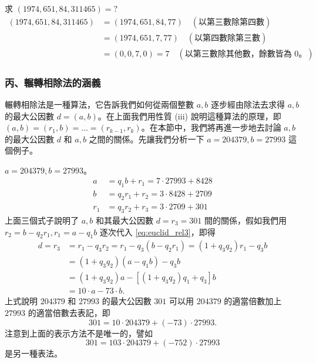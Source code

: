 \begin{example}\label{ex:6-2-5}
求 $(1974, 651, 84, 311465) = ?$
\begin{align*}
  (1974, 651, 84, 311465) &= (1974, 651, 84, 77) \quad (\text{以第三數除第四數}) \\
  &= (1974, 651, 7, 77) \quad (\text{以第四數除第三數}) \\
  &= (0, 0, 7, 0) = 7 \quad (\text{以第三數除其他數，餘數皆為 } 0\text{。})
\end{align*}
\end{example}

\subsubsection*{丙、輾轉相除法的涵義}\label{subsec:6-2-c}

輾轉相除法是一種算法，它告訴我們如何從兩個整數 $a, b$ 逐步經由除法去求得 $a, b$ 的最大公因數 $d=(a, b)$。在上面我們用性質 (iii) 說明這種算法的原理，即 $(a, b) = (r_1, b) = \dots = (r_{k-1}, r_k)$。在本節中，我們將再進一步地去討論 $a, b$ 的最大公因數 $d$ 和 $a, b$ 之間的關係。先讓我們分析一下 $a=204379, b=27993$ 這個例子。

\begin{example}\label{ex:6-2-6}
$a=204379, b=27993$。
\begin{align}
  a &= q_1 b + r_1 = 7 \cdot 27993 + 8428 \label{eq:euclid_rel1} \\
  b &= q_2 r_1 + r_2 = 3 \cdot 8428 + 2709 \label{eq:euclid_rel2} \\
  r_1 &= q_3 r_2 + r_3 = 3 \cdot 2709 + 301 \label{eq:euclid_rel3}
\end{align}
上面三個式子說明了 $a, b$ 和其最大公因數 $d=r_3=301$ 間的關係，假如我們用 $r_2 = b - q_2 r_1, r_1 = a - q_1 b$ 逐次代入 \eqref{eq:euclid_rel3}，即得
\begin{align*}
  d = r_3 &= r_1 - q_3 r_2 = r_1 - q_3(b - q_2 r_1) = (1 + q_3 q_2) r_1 - q_3 b \\
  &= (1 + q_3 q_2)(a - q_1 b) - q_3 b \\
  &= (1 + q_3 q_2) a - [(1 + q_3 q_2) q_1 + q_3] b \\
  &= 10 \cdot a - 73 \cdot b.
\end{align*}
上式說明 $204379$ 和 $27993$ 的最大公因數 $301$ 可以用 $204379$ 的適當倍數加上 $27993$ 的適當倍數去表記，即
\begin{equation*}
  301 = 10 \cdot 204379 + (-73) \cdot 27993.
\end{equation*}
注意到上面的表示方法不是唯一的，譬如
\begin{equation*}
  301 = 103 \cdot 204379 + (-752) \cdot 27993
\end{equation*}
是另一種表法。
\end{example}

